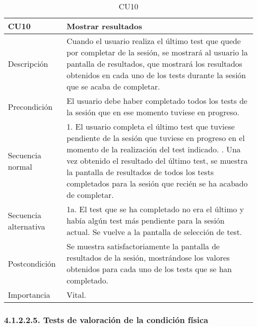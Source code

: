 \begin{table}[H]
\label{CU10}
\begin{center}
\begin{tabular}{| l | p{10cm} |}
\hline
CU10 & Mostrar resultados\\
\hline
Descripción & Cuando el usuario realiza el último test que quede por completar de la sesión, se mostrará al usuario la pantalla de resultados, que mostrará los resultados obtenidos en cada uno de los tests durante la sesión que se acaba de completar.\\
\hline
Precondición & El usuario debe haber completado todos los tests de la sesión que en ese momento tuviese en progreso.\\
\hline
Secuencia normal & 1. El usuario completa el último test que tuviese pendiente de la sesión que tuviese en progreso en el momento de la realización del test indicado.
\newline 2. Una vez obtenido el resultado del último test, se muestra la pantalla de resultados de todos los tests completados para la sesión que recién se ha acabado de completar.\\
\hline
Secuencia alternativa & 1a. El test que se ha completado no era el último y había algún test más pendiente para la sesión actual. Se vuelve a la pantalla de selección de test.\\
\hline
Postcondición & Se muestra satisfactoriamente la pantalla de resultados de la sesión, mostrándose los valores obtenidos para cada uno de los tests que se han completado.\\
\hline
Importancia & Vital.\\
\hline
\end{tabular}
\end{center}
\caption{CU10}
\end{table}

\subsubsection{4.1.2.2.5. Tests de valoración de la condición física}

